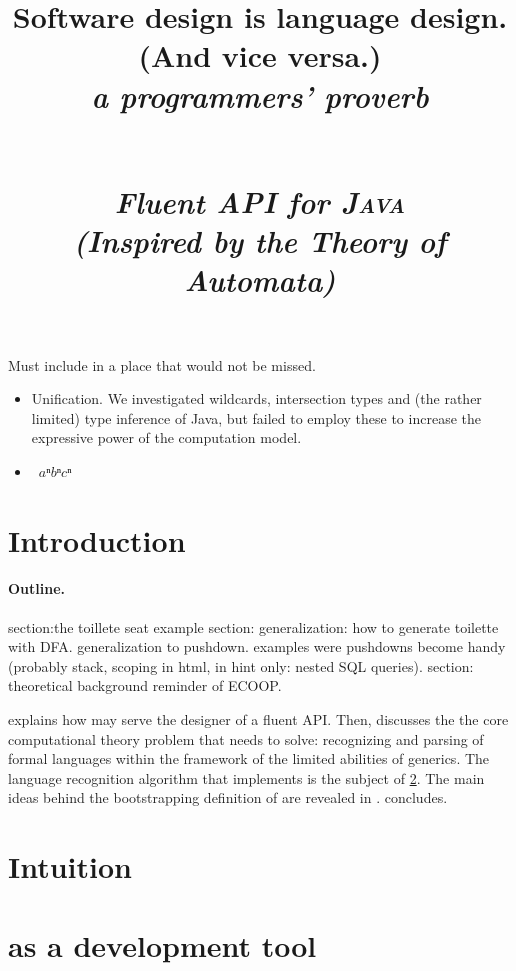 \documentclass[nonatbib,preprint,numbers]{sigplanconf}
\title{%
\begin{flushright}
  \scriptsize\bfseries
  Software design is language design. \\
    (And vice versa.) \\
  \footnotesize\mdseries\itshape
   a programmers' proverb
\end{flushright}
  \Huge \Fajita \\ 
  \huge \itshape \textbf Fluent \textbf API for \textsc{\textbf Java} \\
  \LARGE (\textbf Inspired by the \textbf Theory of \textbf Automata)
}
\begin{document}
\maketitle

\begin{abstract}
  
\end{abstract}

Must include in a place that would not be missed.
\begin{itemize}
  \item \Prolog Unification.  We investigated wildcards, intersection types and
        (the rather limited) type inference of Java, but failed to employ these to
        increase the expressive power of the computation model.
        \item~$aⁿbⁿcⁿ$
\end{itemize}

\section{Introduction}


\paragraph{Outline.} 
section:the toillete seat example
section: generalization:
  how to generate toilette with DFA.
  generalization to pushdown.
  examples were pushdowns become handy (probably stack, scoping in html, in hint only: nested SQL queries).
section: theoretical background
reminder of ECOOP.



  explains how \Fajita may serve the designer of a fluent API. 
Then,  discusses the 
  the core computational theory problem that \Fajita 
  needs to solve: recognizing and parsing of formal languages
  within the framework of the limited abilities of \Java
  generics.
The language recognition algorithm that \Fajita
  implements is the subject of \cref{Section:recognizer}.
The main ideas behind the bootstrapping definition of \Self 
  are revealed in . 
 concludes. 


\section{Intuition}
\label{Section:recognizer}


\section{\Fajita as a development tool}
\label{Section:proposal}

\end{document}
